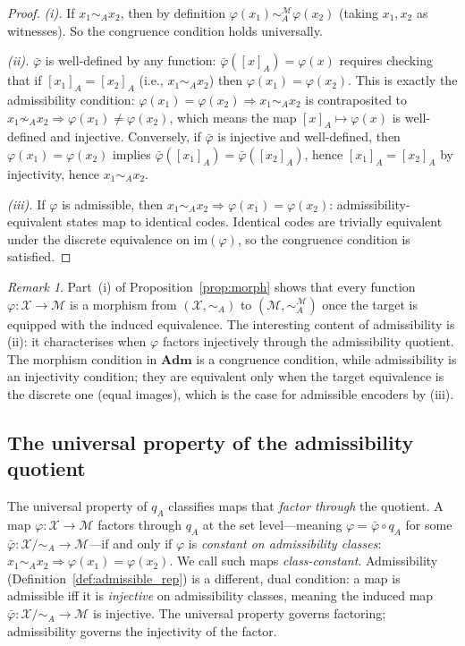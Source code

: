 \documentclass[11pt, a4paper]{article}
\theoremstyle{plain}
\theoremstyle{definition}
\theoremstyle{remark}
\newtheorem{remark}[theorem]{Remark}
\newcommand{\calX}{\mathcal{X}}
\newcommand{\calM}{\mathcal{M}}
\newcommand{\simA}{\sim_{\!A}}
\newcommand{\XmodA}{\calX/{\simA}}
\newcommand{\Adm}{\mathbf{Adm}}
\newcommand{\im}{\mathrm{im}}
\begin{document}
\begin{proof}
\emph{(i).} If $x_1 \simA x_2$, then by definition $\varphi(x_1) \simA^\calM
\varphi(x_2)$ (taking $x_1, x_2$ as witnesses). So the congruence condition
holds universally.

\emph{(ii).} $\bar\varphi$ is well-defined by any function: $\bar\varphi([x]_A)
= \varphi(x)$ requires checking that if $[x_1]_A = [x_2]_A$ (i.e., $x_1 \simA
x_2$) then $\varphi(x_1) = \varphi(x_2)$. This is exactly the admissibility
condition: $\varphi(x_1) = \varphi(x_2) \Rightarrow x_1 \simA x_2$ is
contraposited to $x_1 \not\simA x_2 \Rightarrow \varphi(x_1) \neq \varphi(x_2)$,
which means the map $[x]_A \mapsto \varphi(x)$ is well-defined and injective.
Conversely, if $\bar\varphi$ is injective and well-defined, then
$\varphi(x_1) = \varphi(x_2)$ implies $\bar\varphi([x_1]_A) =
\bar\varphi([x_2]_A)$, hence $[x_1]_A = [x_2]_A$ by injectivity, hence
$x_1 \simA x_2$.

\emph{(iii).} If $\varphi$ is admissible, then $x_1 \simA x_2 \Rightarrow
\varphi(x_1) = \varphi(x_2)$: admissibility-equivalent states map to identical
codes. Identical codes are trivially equivalent under the discrete equivalence
on $\im(\varphi)$, so the congruence condition is satisfied.
\end{proof}

\begin{remark}
Part~(i) of Proposition~\ref{prop:morph} shows that every function
$\varphi\colon \calX \to \calM$ is a morphism from $(\calX, \simA)$ to
$(\calM, \simA^\calM)$ once the target is equipped with the induced equivalence.
The interesting content of admissibility is (ii): it characterises when $\varphi$
factors injectively through the admissibility quotient. The morphism condition
in $\Adm$ is a congruence condition, while admissibility is an injectivity
condition; they are equivalent only when the target equivalence is the
discrete one (equal images), which is the case for admissible encoders by (iii).
\end{remark}

\subsection{The universal property of the admissibility quotient}

The universal property of $q_A$ classifies maps that \emph{factor through}
the quotient. A map $\varphi\colon \calX \to \calM$ factors through $q_A$ at
the set level---meaning $\varphi = \bar\varphi \circ q_A$ for some
$\bar\varphi\colon \XmodA \to \calM$---if and only if $\varphi$ is
\emph{constant on admissibility classes}: $x_1 \simA x_2 \Rightarrow
\varphi(x_1) = \varphi(x_2)$. We call such maps \emph{class-constant}.
Admissibility (Definition~\ref{def:admissible_rep}) is a different, dual
condition: a map is admissible iff it is \emph{injective} on admissibility
classes, meaning the induced map $\bar\varphi\colon \XmodA \to \calM$ is
injective. The universal property governs factoring; admissibility governs the
injectivity of the factor.
\end{document}
